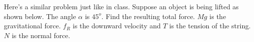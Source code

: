 \documentclass[12pt]{article}
\begin{document}



\newpage

Here's a similar problem just like in class. Suppose an object is being lifted as shown below. The angle $\alpha$ is $45^o$. Find the resulting total force. $Mg$ is the gravitational force. $f_R$ is the downward velocity and $T$ is the tension of the string. $N$ is the normal force.

\def\iangle{35} %

\def\down{-90}
\def\arcr{0.5cm} %
\end{document}
